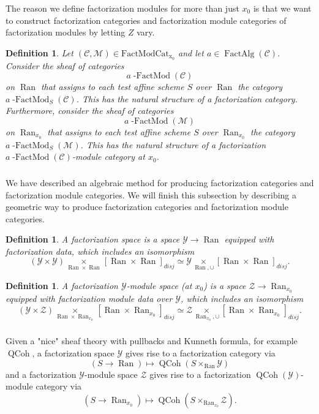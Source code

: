 \documentclass[10pt]{amsart}
\newtheorem{defn}[subsubsection]{Definition}
\theoremstyle{remark}
\newcommand{\on}[1]{\operatorname{#1}}
\newcommand{\QCoh}{\on{QCoh}}
\newcommand{\Ran}{\on{Ran}}
\newcommand{\FactModCat}{\on{FactModCat_{x_0}}}
\newcommand{\sssec}[1]{\subsubsection{}}
\begin{document}
\sssec{}
The reason we define factorization modules for more than just $x_0$ is that we want to construct factorization categories and factorization module categories of factorization modules by letting $Z$ vary.

\begin{defn}
    Let $(\mathcal{C}, \mathcal{M}) \in \FactModCat$ and let $a \in \on{FactAlg}(\mathcal{C})$. Consider the sheaf of categories 
    $$
    a\on{-FactMod}(\mathcal{C})
    $$
    on $\Ran$ that assigns to each test affine scheme $S$ over $\Ran$ the category $a\on{-FactMod}_S(\mathcal{C})$. This has the natural structure of a factorization category. Furthermore, consider the sheaf of categories 
    $$
    a\on{-FactMod}(\mathcal{M})
    $$
    on $\Ran_{x_0}$ that assigns to each test affine scheme $S$ over $\Ran_{x_0}$ the category
    $a\on{-FactMod}_S(\mathcal{M})$. This has the natural structure of a factorization $a\on{-FactMod}(\mathcal{C})$-module category at $x_0$.
\end{defn}

\sssec{}
We have described an algebraic method for producing factorization categories and factorization module categories. We will finish this subsection by describing a geometric way to produce factorization categories and factorization module categories.

\begin{defn}
    A factorization space is a space $\mathcal{Y} \to \Ran$ equipped with factorization data, which includes an isomorphism
    $$
    (\mathcal{Y} \times \mathcal{Y}) \underset{\Ran \times \Ran}{\times} [\Ran \times \Ran]_{disj} \simeq \mathcal{Y} \underset{\Ran, \cup}{\times} [\Ran \times \Ran]_{disj}.
    $$
\end{defn}

\begin{defn}
    A factorization $\mathcal{Y}$-module space (at $x_0$) is a space $\mathcal{Z} \to \Ran_{x_0}$ equipped with factorization module data over $\mathcal{Y}$, which includes an isomorphism
    $$
    (\mathcal{Y} \times \mathcal{Z}) \underset{\Ran \times \Ran_{x_0}}{\times} [\Ran \times \Ran_{x_0}]_{disj} \simeq \mathcal{Z} \underset{\Ran_{x_0}, \cup}{\times} [\Ran \times \Ran_{x_0}]_{disj}.
    $$
\end{defn}

\sssec{}
    Given a "nice" sheaf theory with pullbacks and Kunneth formula, for example $\QCoh$, a factorization space $\mathcal{Y}$ gives rise to a factorization category via
    $$
    (S \to \Ran) \mapsto \QCoh(S \times_{\Ran} \mathcal{Y})
    $$
    and a factorization $\mathcal{Y}$-module space $\mathcal{Z}$ gives rise to a factorization $\QCoh(\mathcal{Y})$-module category via
    $$
    (S \to \Ran_{x_0}) \mapsto \QCoh(S \times_{\Ran_{x_0}} \mathcal{Z}).
    $$
\end{document}
